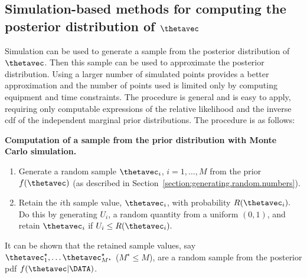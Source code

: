 \subsection{Simulation-based methods for computing the 
	posterior distribution of $ \protect \boldsymbol{\thetavec}$}
\label{section:sim.bayes.comp}
Simulation can be used to generate a sample from the posterior
distribution of $\thetavec$.
Then this sample can be used to approximate the posterior
distribution.  Using a larger number of simulated points provides a
better approximation and the number of points used is limited only
by computing equipment and time constraints.  The procedure is
general and is easy to apply, requiring only computable expressions
of the relative likelihood and the inverse cdf of the independent
marginal prior distributions.  The procedure is as follows:
\begin{algorithm}{\bfseries Computation of a sample from the
prior distribution with Monte Carlo simulation.}
\label{algorithm:bayes.mc.sim}
\begin{enumerate}
\item
Generate a random sample $\thetavec_{i}$, $i=1, \ldots, M$ from the
prior $f(\thetavec)$ (as described in
Section~\ref{section:generating.random.numbers}).
\item
Retain the $i$th
sample value, $\thetavec_{i}$, with probability
$R(\thetavec_{i}).$ Do this by 
generating $U_{i}$, a random quantity from a uniform $(0,1)$,
and retain $\thetavec_{i}$ if
$U_{i} \le R(\thetavec_{i}).$
\end{enumerate}
\end{algorithm}
It can be shown that the 
retained sample values, say
$\thetavec_{1}^{\star}, \ldots
\thetavec_{M^{\star}}^{\star}$ ($M^{\star} \le M$),
are a random sample from
the posterior pdf $f(\thetavec | \DATA)$.

